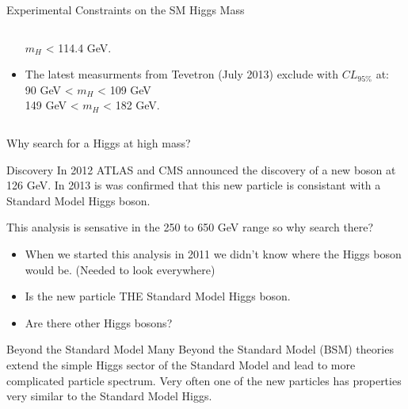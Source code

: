 \begin{frame}{Experimental Constraints on the SM Higgs Mass}
\begin{center}
\begin{columns}
\begin{column}{0.5\textwidth}
\begin{itemize}
  \vspace{.5em}
  $m_H$ < 114.4 GeV.\\
  \vspace{1em}
\item
  The latest measurments from Tevetron (July 2013) exclude with $CL_{95\%}$ at:\\
  \vspace{.5em}
  90 GeV < $m_H$ < 109 GeV\\
  149 GeV < $m_H$ < 182 GeV.
\end{itemize}
\end{column}
\end{columns}
\end{center}
\end{frame}

\begin{frame}{Why search for a Higgs at high mass?}
\begin{block}{Discovery}
In 2012 ATLAS and CMS announced the discovery of a new boson at 126 GeV.  In 2013 is was confirmed that this new particle is consistant with a Standard Model Higgs boson.
\end{block}
This analysis is sensative in the 250 to 650 GeV range so why search there?
\begin{itemize}
\item
When we started this analysis in 2011 we didn't know where the Higgs boson would be. (Needed to look everywhere)
\item
Is the new particle THE Standard Model Higgs boson.
\item
Are there other Higgs bosons?
\end{itemize}
\footnotesize
\begin{block}{Beyond the Standard Model}
Many Beyond the Standard Model (BSM) theories extend the simple Higgs sector of the Standard Model and lead to more complicated particle spectrum. Very often one of the new particles has properties very similar to the Standard Model Higgs.
\end{block}
\end{frame}







